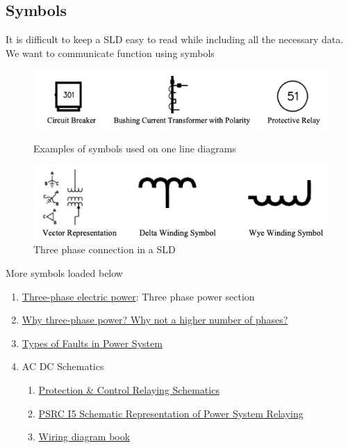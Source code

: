 \subsection{Symbols}
It is difficult to keep a SLD easy to read while including all the necessary data. We want to communicate function using symbols
\begin{figure}[H]
    \centering
    \includegraphics[scale = 0.5]{figs/ch03/sld_symbol.png}
    \caption{Examples of symbols used on one line diagrams}
    \includegraphics[scale = 0.5]{figs/ch03/sld_3phase.png}
    \caption{Three phase connection in a SLD}
\end{figure}

More symbols loaded below



\begin{enumerate}
    \item \href{https://en.wikipedia.org/wiki/Three-phase_electric_power}{Three-phase electric power}: Three phase power section
    \item \href{https://electronics.stackexchange.com/questions/185308/why-three-phase-power-why-not-a-higher-number-of-phases}{Why three-phase power? Why not a higher number of phases?}
    \item \href{https://circuitglobe.com/types-of-faults-in-power-system.html}{Types of Faults in Power System}
    \item AC DC Schematics
    \begin{enumerate}
        \item \href{https://electrical-engineering-portal.com/ac-dc-schematics-protection-control-relaying}{Protection \& Control Relaying Schematics}
        \item \href{https://www.pes-psrc.org/kb/report/047.pdf}{PSRC I5 Schematic Representation of Power System Relaying}
        \item \href{https://www.daltco.com/sites/daltco.com/files/resource/schneider-wiring-diagram-book.pdf}{Wiring diagram book}
    \end{enumerate}
\end{enumerate}